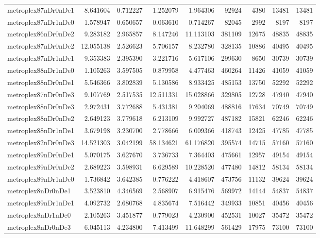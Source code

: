 \begin{longtable}{|l|r|r|r|r|r|r|r|r|}
metroplex87nDr0nDe1 & 8.641604 & 0.712227 & 1.252079 & 1.964306 & 92924 & 4380 & 13481 & 13481 \\
metroplex87nDr1nDe0 & 1.578947 & 0.650657 & 0.063610 & 0.714267 & 82045 & 2992 & 8197 & 8197 \\
metroplex86nDr0nDe2 & 9.283182 & 2.965857 & 8.147246 & 11.113103 & 381109 & 12675 & 48835 & 48835 \\
metroplex87nDr0nDe2 & 12.055138 & 2.526623 & 5.706157 & 8.232780 & 328135 & 10886 & 40495 & 40495 \\
metroplex87nDr1nDe1 & 9.353383 & 2.395390 & 3.221716 & 5.617106 & 299630 & 8650 & 30739 & 30739 \\
metroplex88nDr1nDe0 & 1.105263 & 3.597505 & 0.879958 & 4.477463 & 460264 & 11426 & 41059 & 41059 \\
metroplex88nDr0nDe1 & 5.546366 & 3.802839 & 5.130586 & 8.933425 & 485153 & 13750 & 52292 & 52292 \\
metroplex87nDr0nDe3 & 9.107769 & 2.517535 & 12.511331 & 15.028866 & 329805 & 12728 & 47940 & 47940 \\
metroplex88nDr0nDe3 & 2.972431 & 3.772688 & 5.431381 & 9.204069 & 488816 & 17634 & 70749 & 70749 \\
metroplex88nDr0nDe2 & 2.649123 & 3.779618 & 6.213109 & 9.992727 & 487182 & 15821 & 62246 & 62246 \\
metroplex88nDr1nDe1 & 3.679198 & 3.230700 & 2.778666 & 6.009366 & 418743 & 12425 & 47785 & 47785 \\
metroplex82nDr0nDe3 & 14.521303 & 3.042199 & 58.134621 & 61.176820 & 395574 & 14715 & 57160 & 57160 \\
metroplex89nDr0nDe1 & 5.070175 & 3.627670 & 3.736733 & 7.364403 & 475661 & 12957 & 49154 & 49154 \\
metroplex89nDr0nDe2 & 2.689223 & 3.598931 & 6.629589 & 10.228520 & 477480 & 14812 & 58134 & 58134 \\
metroplex89nDr1nDe0 & 1.736842 & 3.642385 & 0.776222 & 4.418607 & 473756 & 11132 & 39624 & 39624 \\
metroplex8nDr0nDe1 & 3.523810 & 4.346569 & 2.568907 & 6.915476 & 569972 & 14144 & 54837 & 54837 \\
metroplex89nDr1nDe1 & 4.092732 & 2.680768 & 4.835674 & 7.516442 & 349933 & 10851 & 40456 & 40456 \\
metroplex8nDr1nDe0 & 2.105263 & 3.451877 & 0.779023 & 4.230900 & 452531 & 10027 & 35472 & 35472 \\
metroplex8nDr0nDe3 & 6.045113 & 4.234800 & 7.413499 & 11.648299 & 561429 & 17975 & 73100 & 73100 \\

\end{longtable}
